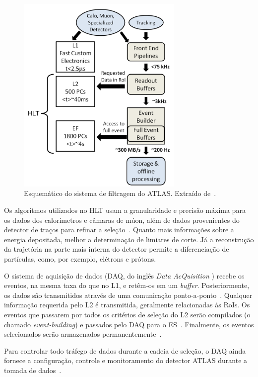 \begin{figure}[htpb!]
    \centering
    \includegraphics[width=8cm]{images/atlas_trigger_system.png}
    \caption[Esquemático do sistema de filtragem do ATLAS.]{Esquemático do
    sistema de filtragem do ATLAS. Extraído de~\cite{ref:2010performance}.}
    \label{fig:triggersystem}
\end{figure}

Os algoritmos utilizados no HLT usam a granularidade e precisão máxima para os
dados dos calorímetros e câmaras de múon, além de dados provenientes do
detector de traços para refinar a seleção~\cite{ATLAS2008}. Quanto mais
informações sobre a energia depositada, melhor a determinação de limiares de
corte. Já a reconstrução da trajetória na parte mais interna do detector
permite a diferenciação de partículas, como, por exemplo, elétrons e prótons.

O sistema de aquisição de dados (DAQ, do inglês \emph{Data AcQuisition} ) recebe
os eventos, na mesma taxa do que no L1, e retêm-os em um \emph{buffer}.
Posteriormente, os dados são transmitidos através de uma comunicação
ponto-a-ponto~\cite{ATLAS2008}.  Qualquer informação requerida pelo L2 é
transmitida, geralmente relacionadas às RoIs. Os eventos que passarem por todos
os critérios de seleção do L2 serão compilados (o chamado \emph{event-building})
e passados pelo DAQ para o ES~\cite{ATLAS2008}. Finalmente, os eventos
selecionados serão armazenados permanentemente~\cite{VAN2009}.

Para controlar todo tráfego de dados durante a cadeia de seleção, o DAQ ainda
fornece a configuração, controle e monitoramento do detector ATLAS durante a
tomada de dados~\cite{ATLAS2008,MIOTTO2010}.

